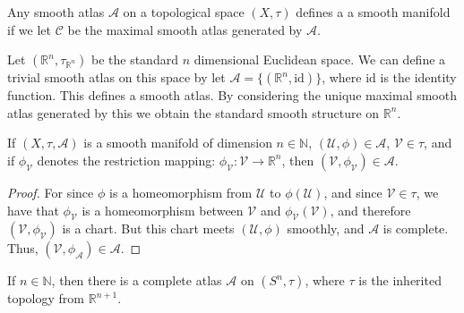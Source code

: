     Any smooth atlas $\mathcal{A}$ on a topological space $(X,\tau)$
    defines a a smooth manifold if we let $\mathcal{C}$ be the maximal
    smooth atlas generated by $\mathcal{A}$.
    \begin{example}
        Let $(\mathbb{R}^{n},\tau_{\mathbb{R}^{n}})$ be the standard
        $n$ dimensional Euclidean space. We can define a trivial smooth
        atlas on this space by let
        $\mathcal{A}=\{(\mathbb{R}^{n},\textrm{id})\}$, where $\textrm{id}$
        is the identity function. This defines a smooth atlas. By
        considering the unique maximal smooth atlas generated by this
        we obtain the standard smooth structure on $\mathbb{R}^{n}$.
    \end{example}
    \begin{theorem}
        If $(X,\tau,\mathcal{A})$ is a smooth manifold of dimension
        $n\in\mathbb{N}$, $(\mathcal{U},\phi)\in\mathcal{A}$,
        $\mathcal{V}\in\tau$, and if $\phi_{\mathcal{V}}$ denotes
        the restriction mapping:
        $\phi_{\mathcal{V}}:\mathcal{V}\rightarrow\mathbb{R}^{n}$,
        then $(\mathcal{V},\phi_{\mathcal{V}})\in\mathcal{A}$.
    \end{theorem}
    \begin{proof}
        For since $\phi$ is a homeomorphism from $\mathcal{U}$ to
        $\phi(\mathcal{U})$, and since $\mathcal{V}\in\tau$, we have
        that $\phi_{\mathcal{V}}$ is a homeomorphism between
        $\mathcal{V}$ and $\phi_{\mathcal{V}}(\mathcal{V})$, and
        therefore $(\mathcal{V},\phi_{\mathcal{V}})$ is a chart. But
        this chart meets $(\mathcal{U},\phi)$ smoothly, and $\mathcal{A}$
        is complete. Thus,
        $(\mathcal{V},\phi_{\mathcal{A}})\in\mathcal{A}$.
    \end{proof}
    \begin{theorem}
        If $n\in\mathbb{N}$, then there is a complete atlas
        $\mathcal{A}$ on $(S^{n},\tau)$, where $\tau$ is the inherited
        topology from $\mathbb{R}^{n+1}$.
    \end{theorem}
